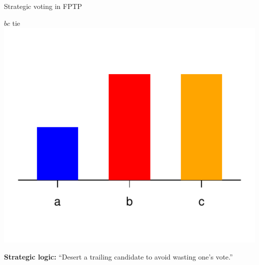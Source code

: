 \documentclass[10pt, en-GB]{beamer}
\begin{document}
\begin{frame}{Strategic voting in FPTP}
\begin{minipage}{.33\textwidth}
\end{minipage}%
\begin{minipage}{.33\textwidth}
\centering $bc$ tie \\ 
\includegraphics[width=\textwidth]{pres_fig/cases_for_paper/plurality_ties_for_first_3.pdf}
\end{minipage}

\pause 

\textbf{Strategic logic:} ``Desert a trailing candidate to avoid wasting one's vote.''  \\
\end{frame} 
\end{document}
